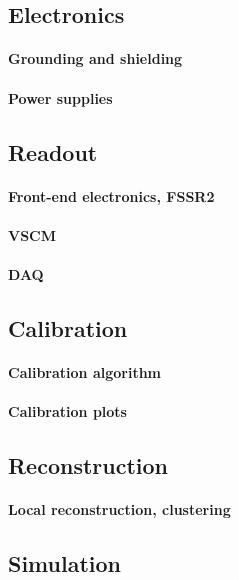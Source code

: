 \subsection{Electronics}
\paragraph{Grounding and shielding}
\paragraph{Power supplies}
\subsection{Readout}
\paragraph{Front-end electronics, FSSR2}
\paragraph{VSCM}
\paragraph{DAQ}
\subsection{Calibration}
\paragraph{Calibration algorithm}
\paragraph{Calibration plots}
\subsection{Reconstruction}
\paragraph{Local reconstruction, clustering}
\subsection{Simulation}
